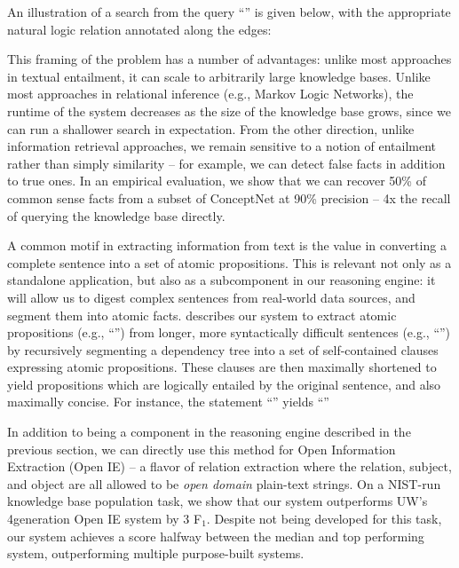 An illustration of a search from the query ``'' 
  is given below, with the appropriate natural logic relation annotated 
  along the edges:

\vspace{1cm}
\begin{center}
\teaserSearch
\end{center}
\vspace{1cm}

This framing of the problem has a number of advantages: unlike most 
  approaches in textual entailment, it can scale to arbitrarily large knowledge 
  bases.
Unlike most approaches in relational inference (e.g., Markov Logic Networks), 
  the runtime of the system decreases as the size of the knowledge base grows, 
  since we can run a shallower search in expectation.
From the other direction, unlike information retrieval approaches, we remain 
  sensitive to a notion of entailment rather than simply similarity -- for example, 
  we can detect false facts in addition to true ones.
In an empirical evaluation, we show that we can recover 50\% of common sense facts 
  from a subset of ConceptNet at 90\% precision -- 4x the recall of querying the knowledge 
  base directly.



%
%
A common motif in extracting information from text is the value in 
  converting a complete sentence into a set of atomic propositions.
This is relevant not only as a standalone application, but also as a
  subcomponent in our reasoning engine: it will allow us to digest complex
  sentences from real-world data sources, and segment them into atomic facts.
 describes our system to extract atomic propositions (e.g., 
  ``'') from longer, more syntactically difficult 
  sentences (e.g., ``'') by recursively 
  segmenting a dependency tree into a set of self-contained clauses expressing 
  atomic propositions.
These clauses are then maximally shortened to yield propositions which are
  logically entailed by the original sentence, and also maximally concise.
For instance, the statement 
  ``'' 
  yields ``'' 

In addition to being a component in the reasoning engine described in the previous 
  section, we can directly use this method for Open Information Extraction 
  (Open IE) -- a flavor of relation extraction where the relation, subject, and 
  object are all allowed to be \textit{open domain} plain-text strings.
On a NIST-run knowledge base population task, we show that our system 
  outperforms UW's 4\nth generation Open IE system by 3 F$_1$.
Despite not being developed for this 
  task, our system achieves a score halfway between the median and top 
  performing system, outperforming multiple purpose-built systems.


